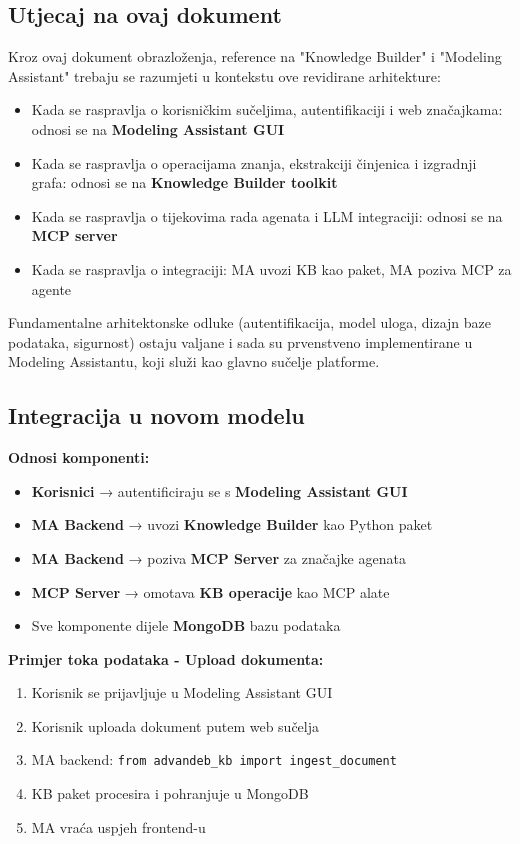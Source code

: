 \documentclass[12pt,a4paper]{article}
\begin{document}
\subsection{Utjecaj na ovaj dokument}

Kroz ovaj dokument obrazloženja, reference na "Knowledge Builder" i "Modeling Assistant" trebaju se razumjeti u kontekstu ove revidirane arhitekture:

\begin{itemize}[noitemsep]
    \item Kada se raspravlja o korisničkim sučeljima, autentifikaciji i web značajkama: odnosi se na \textbf{Modeling Assistant GUI}
    \item Kada se raspravlja o operacijama znanja, ekstrakciji činjenica i izgradnji grafa: odnosi se na \textbf{Knowledge Builder toolkit}
    \item Kada se raspravlja o tijekovima rada agenata i LLM integraciji: odnosi se na \textbf{MCP server}
    \item Kada se raspravlja o integraciji: MA uvozi KB kao paket, MA poziva MCP za agente
\end{itemize}

Fundamentalne arhitektonske odluke (autentifikacija, model uloga, dizajn baze podataka, sigurnost) ostaju valjane i sada su prvenstveno implementirane u Modeling Assistantu, koji služi kao glavno sučelje platforme.

\subsection{Integracija u novom modelu}

\textbf{Odnosi komponenti:}
\begin{itemize}[noitemsep]
    \item \textbf{Korisnici} → autentificiraju se s \textbf{Modeling Assistant GUI}
    \item \textbf{MA Backend} → uvozi \textbf{Knowledge Builder} kao Python paket
    \item \textbf{MA Backend} → poziva \textbf{MCP Server} za značajke agenata
    \item \textbf{MCP Server} → omotava \textbf{KB operacije} kao MCP alate
    \item Sve komponente dijele \textbf{MongoDB} bazu podataka
\end{itemize}

\textbf{Primjer toka podataka - Upload dokumenta:}
\begin{enumerate}[noitemsep]
    \item Korisnik se prijavljuje u Modeling Assistant GUI
    \item Korisnik uploada dokument putem web sučelja
    \item MA backend: \texttt{from advandeb\_kb import ingest\_document}
    \item KB paket procesira i pohranjuje u MongoDB
    \item MA vraća uspjeh frontend-u
\end{enumerate}
\end{document}

